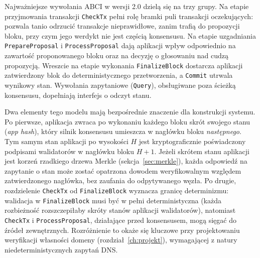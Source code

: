 Najważniejsze wywołania ABCI w wersji 2.0 dzielą się na trzy grupy. Na etapie przyjmowania transakcji \texttt{CheckTx} pełni rolę bramki puli transakcji oczekujących: pozwala tanio odrzucić transakcje nieprawidłowe, zanim trafią do propozycji bloku, przy czym jego werdykt nie jest częścią konsensusu. Na etapie uzgadniania \texttt{PrepareProposal} i \texttt{ProcessProposal} dają aplikacji wpływ odpowiednio na zawartość proponowanego bloku oraz na decyzję o głosowaniu nad cudzą propozycją. Wreszcie na etapie wykonania \texttt{FinalizeBlock} dostarcza aplikacji zatwierdzony blok do deterministycznego przetworzenia, a \texttt{Commit} utrwala wynikowy stan. Wywołania zapytaniowe (\texttt{Query}), obsługiwane poza ścieżką konsensusu, dopełniają interfejs o odczyt stanu.

Dwa elementy tego modelu mają bezpośrednie znaczenie dla konstrukcji systemu. Po pierwsze, aplikacja zwraca po wykonaniu każdego bloku skrót swojego stanu (\emph{app hash}), który silnik konsensusu umieszcza w nagłówku bloku \emph{następnego}. Tym samym stan aplikacji po wysokości $H$ jest kryptograficznie poświadczony podpisami walidatorów w nagłówku bloku $H+1$. Jeżeli skrótem stanu aplikacji jest korzeń rzadkiego drzewa Merkle (sekcja~\ref{sec:merkle}), każda odpowiedź na zapytanie o stan może zostać opatrzona dowodem weryfikowalnym względem zatwierdzonego nagłówka, bez zaufania do odpytywanego węzła. Po drugie, rozdzielenie \texttt{CheckTx} od \texttt{FinalizeBlock} wyznacza granicę determinizmu: walidacja w \texttt{FinalizeBlock} musi być w pełni deterministyczna (każda rozbieżność rozszczepiłaby skróty stanów aplikacji walidatorów), natomiast \texttt{CheckTx} i \texttt{ProcessProposal}, działające przed konsensusem, mogą sięgać do źródeł zewnętrznych. Rozróżnienie to okaże się kluczowe przy projektowaniu weryfikacji własności domeny (rozdział~\ref{ch:projekt}), wymagającej z natury niedeterministycznych zapytań DNS.
